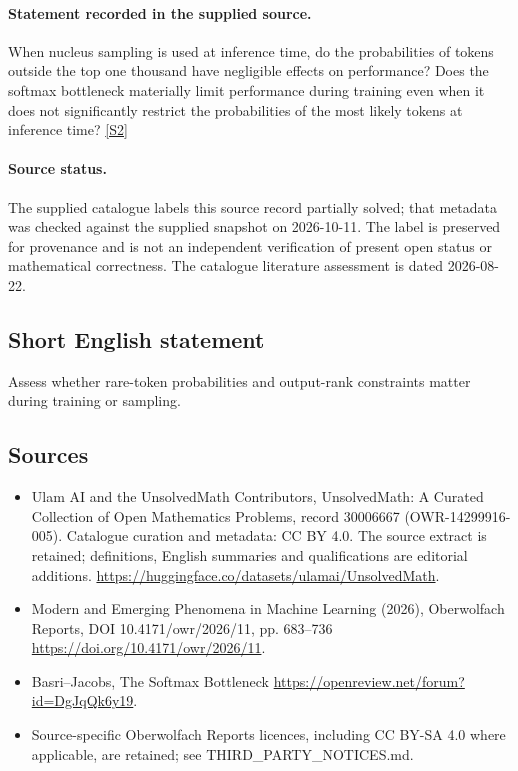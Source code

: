 \documentclass[11pt]{article}
\begin{document}
\paragraph{Statement recorded in the supplied source.}
When nucleus sampling is used at inference time, do the probabilities of tokens outside the top one thousand have negligible effects on performance? Does the softmax bottleneck materially limit performance during training even when it does not significantly restrict the probabilities of the most likely tokens at inference time? \href{https://doi.org/10.4171/owr/2026/11}{[S2]}
\paragraph{Source status.}
The supplied catalogue labels this source record partially solved; that metadata was checked against the supplied snapshot on 2026-10-11. The label is preserved for provenance and is not an independent verification of present open status or mathematical correctness. The catalogue literature assessment is dated 2026-08-22.
\subsection{Short English statement}
Assess whether rare-token probabilities and output-rank constraints matter during training or sampling.
\subsection{Sources}
\begin{itemize}
\item[S1] Ulam AI and the UnsolvedMath Contributors, UnsolvedMath: A Curated Collection of Open Mathematics Problems, record 30006667 (OWR-14299916-005). Catalogue curation and metadata: CC BY 4.0. The source extract is retained; definitions, English summaries and qualifications are editorial additions.
\url{https://huggingface.co/datasets/ulamai/UnsolvedMath}.
\item[S2] Modern and Emerging Phenomena in Machine Learning (2026), Oberwolfach Reports, DOI 10.4171/owr/2026/11, pp. 683--736
\url{https://doi.org/10.4171/owr/2026/11}.
\item[S3] Basri--Jacobs, The Softmax Bottleneck
\url{https://openreview.net/forum?id=DgJqQk6y19}.
\item Source-specific Oberwolfach Reports licences, including CC BY-SA 4.0 where applicable, are retained; see THIRD\_PARTY\_NOTICES.md.
\end{itemize}
\end{document}
